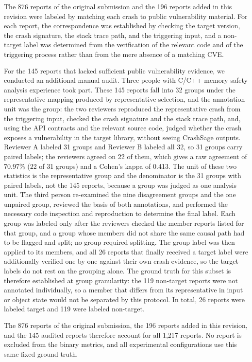 \documentclass[pdflatex,sn-basic]{sn-jnl}%
\theoremstyle{thmstyleone}%
\theoremstyle{thmstyletwo}%
\theoremstyle{thmstylethree}%
\begin{document}
{\color{blue}
The 876 reports of the original submission and the 196 reports added in this revision were labeled by matching each crash to public vulnerability material. For each report, the correspondence was established by checking the target version, the crash signature, the stack trace path, and the triggering input, and a non-target label was determined from the verification of the relevant code and of the triggering process rather than from the mere absence of a matching CVE.

For the 145 reports that lacked sufficient public vulnerability evidence, we conducted an additional manual audit. Three people with C/C++ memory-safety analysis experience took part. These 145 reports fall into 32 groups under the representative mapping produced by representative selection, and the annotation unit was the group: the two reviewers reproduced the representative crash from the triggering input, checked the crash signature and the stack trace path, and, using the API contracts and the relevant source code, judged whether the crash exposes a vulnerability in the target library, without seeing CrashSage outputs. Reviewer A labeled 31 groups and Reviewer B labeled all 32, so 31 groups carry paired labels; the reviewers agreed on 22 of them, which gives a raw agreement of 70.97\% (22 of 31 groups) and a Cohen's kappa of 0.413. The unit of these two statistics is the representative group and the denominator is the 31 groups with paired labels, not the 145 reports, because a group was judged as one analysis unit. The third person re-examined the nine disagreement groups and the one unpaired group, reviewed the basis of both annotations, and performed the necessary code inspection and reproduction to determine the final label. Each group was labeled only after the reviewers checked the member reports listed for that group, and a group whose members did not share the same causal path had to be flagged and split; no group required splitting. The group label was then applied to its members, and all 26 reports that finally received a target label were additionally verified one by one against their own crash evidence, so the target labels do not rest on the grouping alone. The ground truth for this subset is therefore established at group granularity: the 119 non-target reports were not annotated individually, so a member that differs from its representative in input or object state would not be separated by this protocol. In total, 26 reports were labeled target and 119 were labeled non-target.

The 876 reports of the original submission, the 196 reports added in this revision, and the 145 audited reports therefore account for all 1,217 reports. No report is excluded from the binary metrics, and all experimental configurations use this same fixed ground truth.
}
\end{document}
